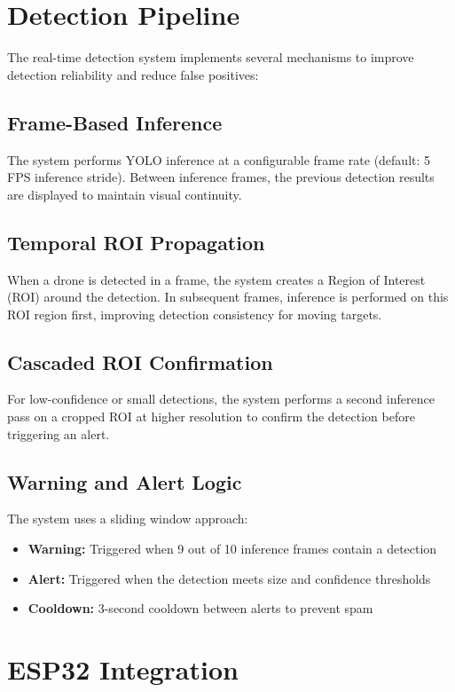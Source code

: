 \documentclass[a4paper,12pt]{report}
\begin{document}
\section{Detection Pipeline}

The real-time detection system implements several mechanisms to improve detection reliability and reduce false positives:

\subsection{Frame-Based Inference}
The system performs YOLO inference at a configurable frame rate (default: 5 FPS inference stride). Between inference frames, the previous detection results are displayed to maintain visual continuity.

\subsection{Temporal ROI Propagation}
When a drone is detected in a frame, the system creates a Region of Interest (ROI) around the detection. In subsequent frames, inference is performed on this ROI region first, improving detection consistency for moving targets.

\subsection{Cascaded ROI Confirmation}
For low-confidence or small detections, the system performs a second inference pass on a cropped ROI at higher resolution to confirm the detection before triggering an alert.

\subsection{Warning and Alert Logic}
The system uses a sliding window approach:
\begin{itemize}
    \item \textbf{Warning:} Triggered when 9 out of 10 inference frames contain a detection
    \item \textbf{Alert:} Triggered when the detection meets size and confidence thresholds
    \item \textbf{Cooldown:} 3-second cooldown between alerts to prevent spam
\end{itemize}

\section{ESP32 Integration}
\end{document}
